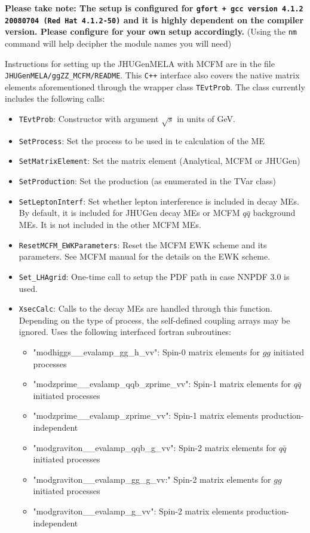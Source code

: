 \documentclass[aps,superscriptaddress,nofootinbib]{revtex4}
\begin{document}
\textbf{Please take note: The setup is configured for \texttt{gfort + gcc version 4.1.2 20080704 (Red Hat 4.1.2-50)} and it is highly dependent on the compiler version.  Please configure for your own setup accordingly.}  (Using the \verb|nm| command will help decipher the module names you will need)

Instructions for setting up the JHUGenMELA with MCFM are in the file \verb|JHUGenMELA/ggZZ_MCFM/README|. This \verb|C++| interface also covers the native matrix elements aforementioned through the wrapper class \verb|TEvtProb|. The class currently includes the following calls:
\begin{itemize}
\item \verb|TEvtProb|: Constructor with argument $\sqrt{s}$ in units of GeV.
\item \verb|SetProcess|: Set the process to be used in te calculation of the ME
\item \verb|SetMatrixElement|: Set the matrix element (Analytical, MCFM or JHUGen)
\item \verb|SetProduction|: Set the production (as enumerated in the TVar class)
\item \verb|SetLeptonInterf|: Set whether lepton interference is included in decay MEs. By default, it is included for JHUGen decay MEs or MCFM $q\bar{q}$ background MEs. It is not included in the other MCFM MEs.

\item \verb|ResetMCFM_EWKParameters|: Reset the MCFM EWK scheme and its parameters. See MCFM manual for the details on the EWK scheme.

\item \verb|Set_LHAgrid|: One-time call to setup the PDF path in case NNPDF 3.0 is used.

\item \verb|XsecCalc|: Calls to the decay MEs are handled through this function. Depending on the type of process, the self-defined coupling arrays may be ignored. Uses the following interfaced fortran subroutines:
\begin{itemize}
\item "modhiggs\_\_evalamp\_gg\_h\_vv": Spin-0 matrix elements for $gg$ initiated processes
\item "modzprime\_\_evalamp\_qqb\_zprime\_vv": Spin-1 matrix elements for $q\bar{q}$ initiated processes
\item "modzprime\_\_evalamp\_zprime\_vv": Spin-1 matrix elements production-independent
\item "modgraviton\_\_evalamp\_qqb\_g\_vv": Spin-2 matrix elements for $q\bar{q}$ initiated processes
\item "modgraviton\_\_evalamp\_gg\_g\_vv:" Spin-2 matrix elements for $gg$ initiated processes
\item "modgraviton\_\_evalamp\_g\_vv": Spin-2 matrix elements production-independent
\end{itemize}


\end{itemize}
\end{document}
